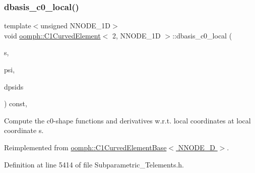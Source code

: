 \subsubsection{\texorpdfstring{dbasis\+\_\+c0\+\_\+local()}{dbasis\_c0\_local()}}
{\footnotesize\ttfamily template$<$unsigned N\+N\+O\+D\+E\+\_\+1D$>$ \\
void \hyperlink{classoomph_1_1C1CurvedElement}{oomph\+::\+C1\+Curved\+Element}$<$ 2, N\+N\+O\+D\+E\+\_\+1D $>$\+::dbasis\+\_\+c0\+\_\+local (\begin{DoxyParamCaption}\item[{const \hyperlink{classoomph_1_1Vector}{Vector}$<$ double $>$ \&}]{s,  }\item[{\hyperlink{classoomph_1_1Shape}{Shape} \&}]{psi,  }\item[{\hyperlink{classoomph_1_1DShape}{D\+Shape} \&}]{dpsids }\end{DoxyParamCaption}) const\hspace{0.3cm}{\ttfamily [inline]}, {\ttfamily [virtual]}}



Compute the c0-\/shape functions and derivatives w.\+r.\+t. local coordinates at local coordinate s. 



Reimplemented from \hyperlink{classoomph_1_1C1CurvedElementBase_aea6eaf2184fb2ebe373b10e0e700caf3}{oomph\+::\+C1\+Curved\+Element\+Base$<$ N\+N\+O\+D\+E\+\_\+D $>$}.



Definition at line 5414 of file Subparametric\+\_\+\+Telements.\+h.

\mbox{\label{classoomph_1_1C1CurvedElement_3_012_00_01NNODE__1D_01_4_acf9269ed50d607b0bd52efcca1848040}} 
